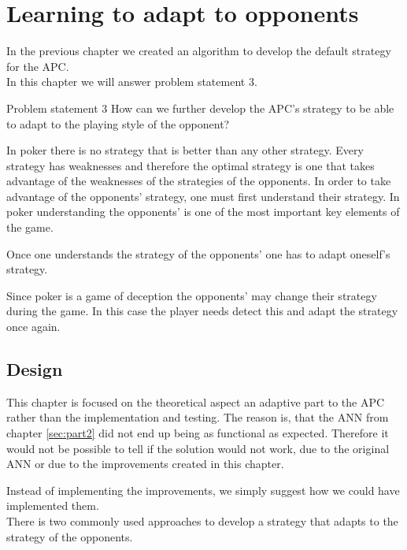 \section{Learning to adapt to opponents}
\label{sec:part3}

In the previous chapter we created an algorithm to develop the default strategy for the APC. \\

In this chapter we will answer problem statement 3.

\vspace{4mm}
\begin{statementBox2}{Problem statement 3}
How can we further develop the APC's strategy to be able to adapt to the playing style of the opponent?
\end{statementBox2}
\vspace{4mm} 

In poker there is no strategy that is better than any other strategy. Every strategy has weaknesses and therefore the optimal strategy is one that takes advantage of the weaknesses of the strategies of the opponents. In order to take advantage of the opponents' strategy, one must first understand their strategy. In poker understanding the opponents' is one of the most important key elements of the game. 

Once one understands the strategy of the opponents' one has to adapt oneself's strategy.

Since poker is a game of deception the opponents' may change their strategy during the game. In this case the player needs detect this and adapt the strategy once again. 

\subsection{Design}
This chapter is focused on the theoretical aspect an adaptive part to the APC rather than the implementation and testing. The reason is, that the ANN from chapter \ref{sec:part2} did not end up being as functional as expected. Therefore it would not be possible to tell if the solution would not work, due to the original ANN or due to the improvements created in this chapter. 

Instead of implementing the improvements, we simply suggest how we could have implemented them.\\

There is two commonly used approaches to develop a strategy that adapts to the strategy of the opponents.

